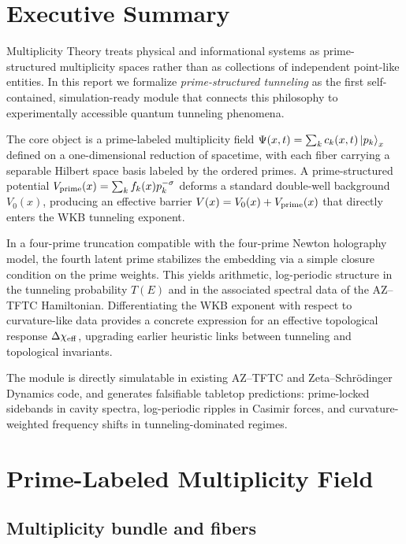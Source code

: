 \documentclass[11pt]{article}
\begin{document}
\section*{Executive Summary}

Multiplicity Theory treats physical and informational systems as
prime-structured multiplicity spaces rather than as collections of
independent point-like entities.\cite{hund_tunneling,multiplicity_overview}
In this report we formalize \emph{prime-structured tunneling} as the
first self-contained, simulation-ready module that connects this
philosophy to experimentally accessible quantum tunneling phenomena.

The core object is a prime-labeled multiplicity field
\(\Psi(x,t) = \sum_k c_k(x,t)\ket{p_k}_x\) defined on a one-dimensional
reduction of spacetime, with each fiber carrying a separable Hilbert
space basis labeled by the ordered primes.\cite{tunneling_topology_draft}
A prime-structured potential
\(V_{\rm prime}(x) = \sum_k f_k(x)p_k^{-\sigma}\) deforms a standard
double-well background \(V_0(x)\), producing an effective barrier
\(V(x)=V_0(x)+V_{\rm prime}(x)\) that directly enters the WKB tunneling
exponent.

In a four-prime truncation compatible with the four-prime Newton
holography model, the fourth latent prime stabilizes the embedding via a
simple closure condition on the prime weights. This yields arithmetic,
log-periodic structure in the tunneling probability \(T(E)\) and in the
associated spectral data of the AZ--TFTC Hamiltonian. Differentiating
the WKB exponent with respect to curvature-like data provides a concrete
expression for an effective topological response
\(\Delta\chi_{\rm eff}\), upgrading earlier heuristic links between
tunneling and topological invariants.

The module is directly simulatable in existing AZ--TFTC and
Zeta--Schr\"odinger Dynamics code, and generates falsifiable tabletop
predictions: prime-locked sidebands in cavity spectra, log-periodic
ripples in Casimir forces, and curvature-weighted frequency shifts in
tunneling-dominated regimes.

\section{Prime-Labeled Multiplicity Field}

\subsection{Multiplicity bundle and fibers}
\end{document}
